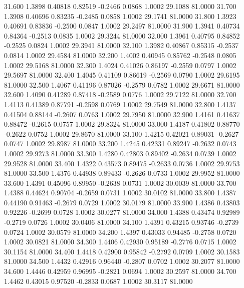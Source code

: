   31.600   1.3898   0.40818   0.82519  -0.2466   0.0868   1.0002  29.1088  81.0000
  31.700   1.3908   0.40696   0.83235  -0.2485   0.0858   1.0002  29.1741  81.0000
  31.800   1.3923   0.40691   0.83836  -0.2500   0.0847   1.0002  29.2497  81.0000
  31.900   1.3941   0.40734   0.84364  -0.2513   0.0835   1.0002  29.3244  81.0000
  32.000   1.3961   0.40795   0.84852  -0.2525   0.0824   1.0002  29.3941  81.0000
  32.100   1.3982   0.40867   0.85315  -0.2537   0.0814   1.0002  29.4584  81.0000
  32.200   1.4002   0.40945   0.85762  -0.2548   0.0805   1.0002  29.5168  81.0000
  32.300   1.4024   0.41026   0.86197  -0.2559   0.0797   1.0002  29.5697  81.0000
  32.400   1.4045   0.41109   0.86619  -0.2569   0.0790   1.0002  29.6195  81.0000
  32.500   1.4067   0.41196   0.87026  -0.2579   0.0782   1.0002  29.6671  81.0000
  32.600   1.4090   0.41289   0.87418  -0.2589   0.0776   1.0002  29.7122  81.0000
  32.700   1.4113   0.41389   0.87791  -0.2598   0.0769   1.0002  29.7549  81.0000
  32.800   1.4137   0.41504   0.88144  -0.2607   0.0763   1.0002  29.7950  81.0000
  32.900   1.4161   0.41637   0.88472  -0.2615   0.0757   1.0002  29.8324  81.0000
  33.000   1.4187   0.41802   0.88770  -0.2622   0.0752   1.0002  29.8670  81.0000
  33.100   1.4215   0.42021   0.89031  -0.2627   0.0747   1.0002  29.8987  81.0000
  33.200   1.4245   0.42331   0.89247  -0.2632   0.0743   1.0002  29.9273  81.0000
  33.300   1.4280   0.42803   0.89402  -0.2634   0.0739   1.0002  29.9528  81.0000
  33.400   1.4322   0.43573   0.89475  -0.2633   0.0736   1.0002  29.9753  81.0000
  33.500   1.4376   0.44938   0.89433  -0.2626   0.0733   1.0002  29.9952  81.0000
  33.600   1.4391   0.45096   0.89950  -0.2638   0.0731   1.0002  30.0039  81.0000
  33.700   1.4388   0.44624   0.90704  -0.2659   0.0731   1.0002  30.0102  81.0000
  33.800   1.4387   0.44190   0.91463  -0.2679   0.0729   1.0002  30.0179  81.0000
  33.900   1.4386   0.43803   0.92226  -0.2699   0.0728   1.0002  30.0277  81.0000
  34.000   1.4388   0.43474   0.92989  -0.2719   0.0726   1.0002  30.0406  81.0000
  34.100   1.4391   0.43215   0.93746  -0.2739   0.0724   1.0002  30.0579  81.0000
  34.200   1.4397   0.43033   0.94485  -0.2758   0.0720   1.0002  30.0821  81.0000
  34.300   1.4406   0.42930   0.95189  -0.2776   0.0715   1.0002  30.1154  81.0000
  34.400   1.4418   0.42900   0.95842  -0.2792   0.0709   1.0002  30.1583  81.0000
  34.500   1.4432   0.42916   0.96440  -0.2807   0.0702   1.0002  30.2077  81.0000
  34.600   1.4446   0.42959   0.96995  -0.2821   0.0694   1.0002  30.2597  81.0000
  34.700   1.4462   0.43015   0.97520  -0.2833   0.0687   1.0002  30.3117  81.0000
